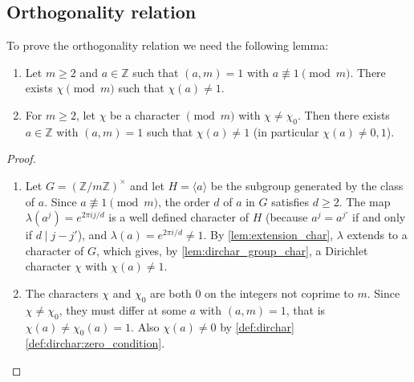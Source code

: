 \subsection{Orthogonality relation}
To prove the orthogonality relation we need the following lemma:
\begin{lemma}\label{lem:existence_dir_char}\leavevmode
    \begin{enumerate}[label={\upshape\roman*)}]
        \item\label{lem:existence_dir_char:i} Let $m\ge 2$ and $a \in \mathbb{Z}$ such that $(a,m)=1$ with $a\not \equiv 1 \pmod m$. There exists $\chi \pmod m$ such that $\chi(a) \neq 1$.
        \item\label{lem:existence_dir_char:ii} For $m\ge 2$, let $\chi$ be a character $\pmod m$ with $\chi \neq \chi_0$. Then there exists $a \in \mathbb{Z}$ with $(a,m) = 1$ such that $\chi(a)\neq 1$ (in particular $\chi(a) \neq 0,1$).
    \end{enumerate}
\end{lemma}
\begin{proof}\leavevmode
    \begin{enumerate}[label={\upshape\roman*)}]
        \item Let $G = \left(\mathbb{Z}/m\mathbb{Z}\right)^\times$ and let $H = \langle a\rangle$ be the subgroup generated by the class of $a$. Since $a\not\equiv1\pmod m$, the order $d$ of $a$ in $G$ satisfies $d\ge2$. The map $\lambda(a^j) = e^{2\pi ij/d}$ is a well defined character of $H$ (because $a^j = a^{j'}$ if and only if $d\mid j-j'$), and $\lambda(a) = e^{2\pi i/d}\neq1$. By \cref{lem:extension_char}, $\lambda$ extends to a character of $G$, which gives, by \cref{lem:dirchar_group_char}, a Dirichlet character $\chi$ with $\chi(a) \neq 1$.
        \item The characters $\chi$ and $\chi_0$ are both $0$ on the integers not coprime to $m$. Since $\chi \neq\chi_0$, they must differ at some $a$ with $(a,m) = 1$, that is $\chi(a)\neq\chi_0(a) = 1$. Also $\chi(a) \neq 0$ by \cref{def:dirchar} \ref{def:dirchar:zero_condition}.
    \end{enumerate}
\end{proof}

